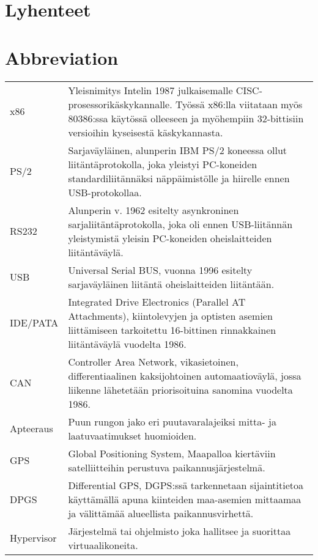 \pagestyle{empty}
\setlength{\parskip}{1cm}
 {
  \chapter*{Lyhenteet}
} {
  \chapter*{Abbreviation}
}
\begin{table}[h]
\setlength{\tabcolsep}{8pt}
\renewcommand{\arraystretch}{2}
\begin{tabular}{l p{12cm}}
x86 & Yleisnimitys Intelin 1987 julkaisemalle CISC-prosessorikäskykannalle. Työssä x86:lla viitataan myös 80386:ssa käytössä olleeseen ja myöhempiin 32-bittisiin versioihin kyseisestä käskykannasta.\\
PS/2 & Sarjaväyläinen, alunperin IBM PS/2 koneessa ollut liitäntäprotokolla, joka yleistyi PC-koneiden standardiliitännäksi näppäimistölle ja hiirelle ennen USB-protokollaa.\\
RS232 & Alunperin v. 1962 esitelty asynkroninen sarjaliitäntäprotokolla, joka oli ennen USB-liitännän yleistymistä yleisin PC-koneiden oheislaitteiden liitäntäväylä.\\
USB & Universal Serial BUS, vuonna 1996 esitelty sarjaväyläinen liitäntä oheislaitteiden liitäntään.\\
IDE/PATA & Integrated Drive Electronics (Parallel AT Attachments), kiintolevyjen ja optisten asemien liittämiseen tarkoitettu 16-bittinen rinnakkainen liitäntäväylä vuodelta 1986.\\
CAN & Controller Area Network, vikasietoinen, differentiaalinen kaksijohtoinen automaatioväylä, jossa liikenne lähetetään priorisoituina sanomina vuodelta 1986.\\
Apteeraus & Puun rungon jako eri puutavaralajeiksi mitta- ja laatuvaatimukset huomioiden.\\
GPS & Global Positioning System, Maapalloa kiertäviin satelliitteihin perustuva paikannusjärjestelmä.\\
DPGS & Differential GPS, DGPS:ssä tarkennetaan sijaintitietoa käyttämällä apuna kiinteiden maa-asemien mittaamaa ja välittämää alueellista paikannusvirhettä.\\
Hypervisor & Järjestelmä tai ohjelmisto joka hallitsee ja suorittaa virtuaalikoneita.\\
%
\end{tabular}
\end{table}

